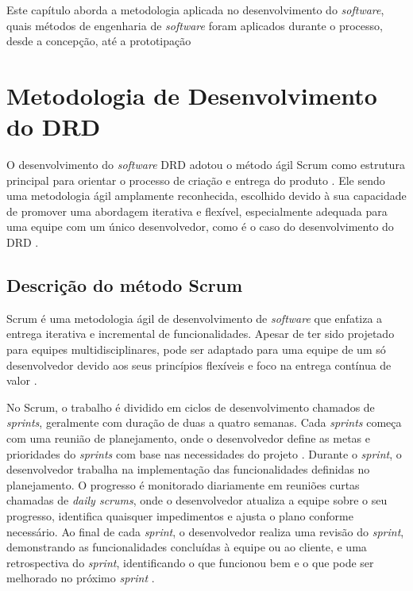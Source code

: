 \label{Cap:Metodologia}

Este capítulo aborda a metodologia aplicada no desenvolvimento do \textit{software}, quais métodos de engenharia de \textit{software} foram aplicados durante o processo, desde a concepção, até a prototipação

\section{Metodologia de Desenvolvimento do DRD}

O desenvolvimento do \textit{software} DRD adotou o método ágil Scrum como estrutura principal para orientar o processo de criação e entrega do produto \cite{softwareengreq}. Ele sendo uma metodologia ágil amplamente reconhecida, escolhido devido à sua capacidade de promover uma abordagem iterativa e flexível, especialmente adequada para uma equipe com um único desenvolvedor, como é o caso do desenvolvimento do DRD \cite{scrum}.

\subsection{Descrição do método Scrum}

Scrum é uma metodologia ágil de desenvolvimento de \textit{software} que enfatiza a entrega iterativa e incremental de funcionalidades. Apesar de ter sido projetado para equipes multidisciplinares, pode ser adaptado para uma equipe de um só desenvolvedor devido aos seus princípios flexíveis e foco na entrega contínua de valor \cite{scrumlove}.
        
No Scrum, o trabalho é dividido em ciclos de desenvolvimento chamados de \textit{sprints}, geralmente com duração de duas a quatro semanas. Cada \textit{sprints} começa com uma reunião de planejamento, onde o desenvolvedor define as metas e prioridades do \textit{sprints} com base nas necessidades do projeto \cite{scrummic}. Durante o \textit{sprint}, o desenvolvedor trabalha na implementação das funcionalidades definidas no planejamento. O progresso é monitorado diariamente em reuniões curtas chamadas de \textit{daily scrums}, onde o desenvolvedor atualiza a equipe sobre o seu progresso, identifica quaisquer impedimentos e ajusta o plano conforme necessário. Ao final de cada \textit{sprint}, o desenvolvedor realiza uma revisão do \textit{sprint}, demonstrando as funcionalidades concluídas à equipe ou ao cliente, e uma retrospectiva do \textit{sprint}, identificando o que funcionou bem e o que pode ser melhorado no próximo \textit{sprint} \cite{scrumproj}.
        
